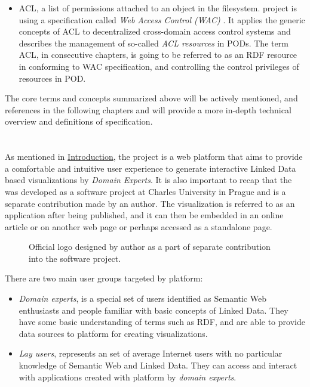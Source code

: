 \begin{itemize}
    \item \acrfull{ACL}, a list of permissions attached to an object in the filesystem. \solid{} project is using a specification called \textit{Web Access Control (WAC)} \cite{solid_wac_specification}. It applies the generic concepts of ACL to decentralized cross-domain access control systems and describes the management of so-called \textit{ACL resources} in \solid{} PODs. The term ACL, in consecutive chapters, is going to be referred to as an RDF resource in \solid{} conforming to WAC specification, and controlling the control privileges of resources in POD. 
\end{itemize} 

The core terms and concepts summarized above will be actively mentioned, and references in the following chapters and will provide a more in-depth technical overview and definitions of \solid{} specification. 

\section{\lpa{}}

As mentioned in \hyperref[chap:introduction]{Introduction}, the \lpa{} project is a web platform that aims to provide a comfortable and intuitive user experience to generate interactive Linked Data based visualizations by \textit{Domain Experts}. It is also important to recap that the \lpa{} was developed as a software project at Charles University in Prague and is a separate contribution made by an author. The visualization is referred to as an application after being published, and it can then be embedded in an online article or on another web page or perhaps accessed as a standalone page. 

\begin{figure}[ht]
\centering
{}
\caption{Official \lpa{} logo designed by author as a part of separate contribution into the software project.}
\label{fig:lpa_logo}
\end{figure}

There are two main user groups targeted by \lpa{} platform:
\begin{itemize}
	\item \textit{Domain experts}, is a special set of users identified as Semantic Web enthusiasts and people familiar with basic concepts of Linked Data. They have some basic understanding of terms such as RDF, and are able to provide data sources to \lpa{} platform for creating visualizations.
	\item \textit{Lay users}, represents an set of average Internet users with no particular knowledge of Semantic Web and Linked Data. They can access and interact with applications created with \lpa{} platform by \textit{domain experts}.
\end{itemize}

